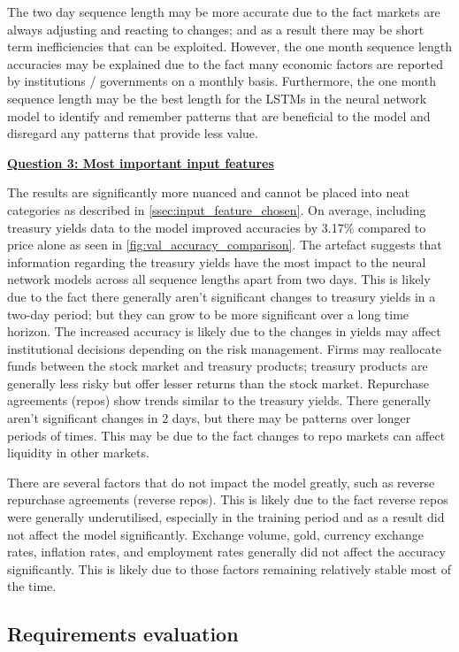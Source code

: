 The two day sequence length may be more accurate due to the fact markets are always adjusting and reacting to changes; and as a result
there may be short term inefficiencies that can be exploited. However, the one month sequence length accuracies may be explained due to
the fact many economic factors are reported by institutions / governments on a monthly basis. Furthermore, the one month sequence length
may be the best length for the LSTMs in the neural network model to identify and remember patterns that are beneficial to the model and
disregard any patterns that provide less value.

\hyperref[most_important_features_question]{\textbf{Question 3: Most important input features}}

The results are significantly more nuanced and cannot be placed into neat categories as described in \autoref{ssec:input_feature_chosen}.
On average, including treasury yields data to the model improved accuracies by 3.17\% compared to price alone as seen in
\autoref{fig:val_accuracy_comparison}.
The artefact suggests that information regarding the treasury yields have the most impact to the neural network models across all sequence
lengths apart from two days. 
This is likely due to the fact there generally aren't significant changes to treasury yields in a two-day period; but they can
grow to be more significant over a long time horizon. The increased accuracy is likely due to the changes in yields may affect institutional decisions
depending on the risk management. Firms may reallocate funds between the stock market and treasury products; treasury products are generally less risky but
offer lesser returns than the stock market. Repurchase agreements (repos) show trends similar to the treasury yields. There generally aren't significant
changes in 2 days, but there may be patterns over longer periods of times. This may be due to the fact changes to repo markets
can affect liquidity in other markets.

There are several factors that do not impact the model greatly, such as reverse repurchase agreements (reverse repos).
This is likely due to the fact reverse repos were generally underutilised, especially in the training period and as a result did 
not affect the model significantly. Exchange volume, gold, currency exchange rates, inflation rates, and employment rates
generally did not affect the accuracy significantly. This is likely due to those factors remaining relatively stable most of the time.

\subsection{Requirements evaluation}
